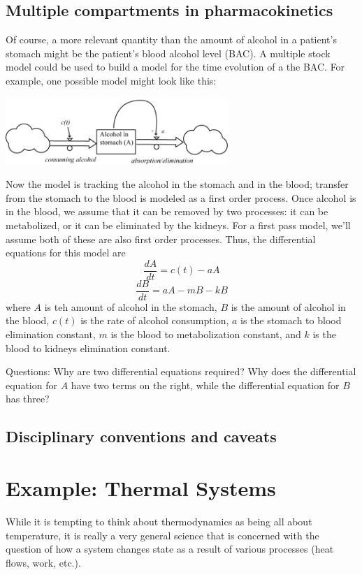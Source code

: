 \documentclass[10pt]{book}
\newcommand{\beforefig}{\vspace{0.2in}}
\newcommand{\afterfig}{\vspace{0.2in}}
\begin{document}
\subsection{Multiple compartments in pharmacokinetics}

Of course, a more relevant quantity than the amount of alcohol in a patient's stomach might be the patient's blood alcohol level (BAC).  A multiple stock model could be used to build a model for the time evolution of a the BAC.  For example, one possible model might look like this:

\beforefig
 \centerline{\includegraphics[height=1in]{figs/AlcoholExample1}}
\afterfig

Now the model is tracking the alcohol in the stomach and in the blood; transfer from the stomach to the blood is modeled as a first order process.  Once alcohol is in the blood, we assume that it can be removed by two processes:  it can be metabolized, or it can be eliminated by the kidneys.  For a first pass model, we'll assume both of these are also first order processes.  Thus, the differential equations for this model are
$$\frac{dA}{dt} = c(t) - aA$$
$$\frac{dB}{dt} =  aA - mB - kB$$
where $A$ is teh amount of alcohol in the stomach, $B$ is the amount of alcohol in the blood,  $c(t)$ is the rate of alcohol consumption, $a$ is the stomach to blood elimination constant, $m$ is the blood to metabolization constant, and $k$ is the blood to kidneys elimination constant.

Questions:  Why are two differential equations required?  Why does the differential equation for $A$ have two terms on the right, while the differential equation for $B$ has three?

\subsection{Disciplinary conventions and caveats}

 
 
 \section{Example: Thermal Systems}

While it is tempting to think about thermodynamics as being all about temperature, it is really a very general science that is concerned with the question of how a system changes state as a result of various processes (heat flows, work, etc.).  
\end{document}
